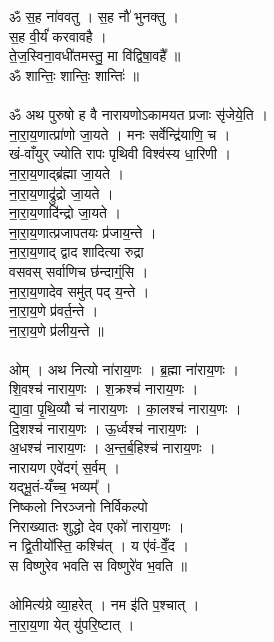 \section{}
ॐ स॒ह ना॑ववतु । स॒ह नौ॑ भुनक्तु । \\
स॒ह वी॒र्यं॑ करवावहै ।\\
ते॒ज॒स्विना॒वधी॑तमस्तु॒ मा वि॑द्विषा॒वहै᳚ ॥\\
ॐ शान्तिः॒ शान्तिः॒ शान्तिः॑ ॥\\
\\
ॐ अथ पुरुषो ह वै नारायणोऽकामयत प्रजाः सृ॑जेये॒ति ।\\
ना॒रा॒य॒णात्प्रा॑णो जा॒यते । मनः सर्वेन्द्रि॑याणि॒ च ।\\
खं-वाँयुर् ज्योति रापः पृथिवी विश्व॑स्य धा॒रिणी ।\\
ना॒रा॒य॒णाद्ब्र॑ह्मा जा॒यते ।\\
ना॒रा॒य॒णाद्रु॑द्रो जा॒यते ।\\
ना॒रा॒य॒णादि॑न्द्रो जा॒यते ।\\
ना॒रा॒य॒णात्प्रजापतयः प्र॑जाय॒न्ते ।\\
ना॒रा॒य॒णाद् द्वाद शादित्या रुद्रा \\
वसवस् सर्वाणिच छ॑न्दाग्ं॒सि ।\\
ना॒रा॒य॒णादेव समु॑त् पद् य॒न्ते ।\\
ना॒रा॒य॒णे प्र॑वर्त॒न्ते ।\\
ना॒रा॒य॒णे प्र॑लीय॒न्ते ॥\\
\\
ओम् । अथ नित्यो ना॑राय॒णः । ब्र॒ह्मा ना॑राय॒णः ।\\
शि॒वश्च॑ नाराय॒णः । श॒क्रश्च॑ नाराय॒णः ।\\
द्या॒वा॒ पृ॒थि॒व्यौ च॑ नाराय॒णः । का॒लश्च॑ नाराय॒णः ।\\
दि॒शश्च॑ नाराय॒णः । ऊ॒र्ध्वश्च॑ नाराय॒णः ।\\
अ॒धश्च॑ नाराय॒णः । अ॒न्त॒र्ब॒हिश्च॑ नाराय॒णः ।\\
नारायण एवे॑दग्ं स॒र्वम् ।\\
यद्भू॒तं-यँच्च॒ भव्यम्᳚ ।\\
निष्कलो निरञ्जनो निर्विकल्पो\\
निराख्यातः शुद्धो देव एको॑ नाराय॒णः । \\
न द्वि॒तीयो᳚स्ति॒ कश्चि॑त् । य ए॑वं-वेँ॒द ।\\
स विष्णुरेव भवति स विष्णुरे॑व भ॒वति ॥\\
\\
ओमित्य॑ग्रे व्या॒हरेत् । नम इ॑ति प॒श्चात् ।\\
ना॒रा॒य॒णा येत् यु॑परि॒ष्टात् ।\\

